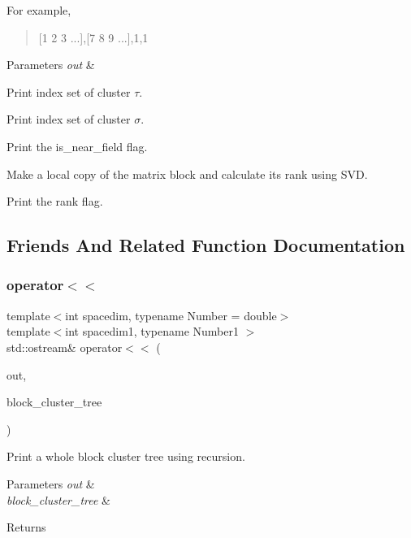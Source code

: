 For example,

\begin{quote}
\mbox{[}1 2 3 ...\mbox{]},\mbox{[}7 8 9 ...\mbox{]},1,1 \end{quote}

\begin{DoxyParams}{Parameters}
{\em out} & \\
\hline
\end{DoxyParams}
Print index set of cluster $\tau$.

Print index set of cluster $\sigma$.

Print the {\ttfamily is\+\_\+near\+\_\+field} flag.

Make a local copy of the matrix block and calculate its rank using S\+VD.

Print the {\ttfamily rank} flag.

\subsection{Friends And Related Function Documentation}
\mbox{\label{classBlockClusterTree_a6ead7d49add78a2462eb039f00bf7f6a}} 
\subsubsection{\texorpdfstring{operator$<$$<$}{operator<<}}
{\footnotesize\ttfamily template$<$int spacedim, typename Number = double$>$ \\
template$<$int spacedim1, typename Number1 $>$ \\
std\+::ostream\& operator$<$$<$ (\begin{DoxyParamCaption}\item[{std\+::ostream \&}]{out,  }\item[{const \hyperlink{classBlockClusterTree}{Block\+Cluster\+Tree}$<$ spacedim1, Number1 $>$ \&}]{block\+\_\+cluster\+\_\+tree }\end{DoxyParamCaption})\hspace{0.3cm}{\ttfamily [friend]}}

Print a whole block cluster tree using recursion. 
\begin{DoxyParams}{Parameters}
{\em out} & \\
\hline
{\em block\+\_\+cluster\+\_\+tree} & \\
\hline
\end{DoxyParams}
\begin{DoxyReturn}{Returns}

\end{DoxyReturn}



